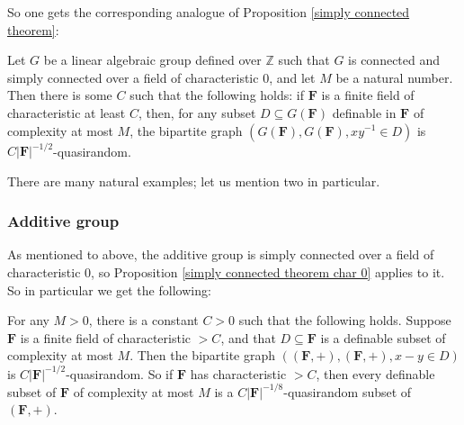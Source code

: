 \documentclass[10pt]{article}
\begin{document}
{So one gets the corresponding analogue of Proposition \ref{simply connected theorem}:

\begin{proposition}\label{simply connected theorem char 0}
    Let $G$ be a linear algebraic group defined over $\mathbb{Z}$ such that $G$ is connected and simply connected over a field of characteristic $0$, and let $M$ be a natural number. Then there is some $C$ such that the following holds: if $\mathbf{F}$ is a finite field of characteristic at least $C$, then, for any subset $D\subseteq G(\mathbf{F})$ definable in $\mathbf{F}$ of complexity at most $M$, the bipartite graph $(G(\mathbf{F}),G(\mathbf{F}),xy^{-1}\in D)$ is $C|\mathbf{F}|^{-1/2}$-quasirandom.
\end{proposition}

There are many natural examples; let us mention two in particular.

 \subsubsection{Additive group}\label{additive group section}
As mentioned to above, the additive group is simply connected over a field of characteristic $0$, so Proposition \ref{simply connected theorem char 0} applies to it. So in particular we get the following:

 \begin{proposition}\label{char_0}
     For any $M>0$, there is a constant $C>0$ such that the following holds. Suppose $\mathbf{F}$ is a finite field of characteristic $>C$, and that $D\subseteq \mathbf{F}$ is a definable subset  of complexity at most $M$. Then the bipartite graph $((\mathbf{F},+),(\mathbf{F},+),x-y\in D)$ is $C|\mathbf{F}|^{-1/2}$-quasirandom. So if $\mathbf{F}$ has characteristic $>C$, then every definable subset of $\mathbf{F}$ of complexity at most $M$ is a $C|\mathbf{F}|^{-1/8}$-quasirandom subset of $(\mathbf{F},+)$.
 \end{proposition}

}
\end{document}
